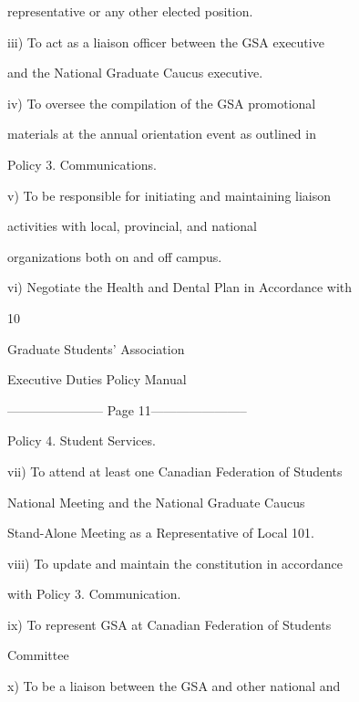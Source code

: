                   representative or any other elected position.   

  

         iii)     To  act  as  a  liaison  officer  between  the  GSA  executive  

                  and the National Graduate Caucus executive.   

         iv)      To  oversee  the  compilation  of  the  GSA  promotional  

                  materials  at  the  annual  orientation  event  as  outlined  in  

                  Policy 3. Communications.   

         v)       To  be  responsible  for  initiating  and  maintaining  liaison  

                  activities        with       local,      provincial,         and       national  

                  organizations both on and off campus.   

         vi)      Negotiate the Health and Dental Plan in Accordance with  



                                                 10  

                                      

                                    Graduate Students’ Association  

                                   Executive Duties Policy Manual  

  


----------------------- Page 11-----------------------

           Policy 4. Student Services.   

vii)       To  attend  at  least  one  Canadian  Federation  of  Students  

           National  Meeting  and  the  National  Graduate  Caucus  

           Stand-Alone Meeting as a Representative of Local 101.   

viii)      To  update  and  maintain  the  constitution  in  accordance  

           with Policy 3. Communication.   

ix)        To  represent  GSA  at  Canadian  Federation  of  Students  

           Committee  

x)         To be a liaison between the GSA and other national and  

